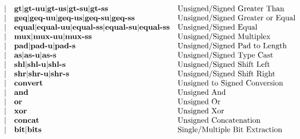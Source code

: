 \documentclass[12pt]{article}
\begin{document}
\[\begin{array}{rll}
\vert           &\text{\bf gt}         \vert \text{\bf gt-uu}      \vert \text{\bf gt-us}      \vert \text{\bf gt-su}    \vert \text{\bf gt-ss}      &\text{Unsigned/Signed Greater Than}\\
\vert           &\text{\bf geq}        \vert \text{\bf geq-uu}     \vert \text{\bf geq-us}     \vert \text{\bf geq-su}   \vert \text{\bf geq-ss}     &\text{Unsigned/Signed Greater or Equal}\\
\vert           &\text{\bf equal}      \vert \text{\bf equal-uu}   \vert \text{\bf equal-ss}   \vert \text{\bf equal-su} \vert \text{\bf equal-ss}   &\text{Unsigned/Signed Equal}\\
\vert           &\text{\bf mux}        \vert \text{\bf mux-uu}     \vert \text{\bf mux-ss}                                                 &\text{Unsigned/Signed Multiplex}\\
\vert           &\text{\bf pad}        \vert \text{\bf pad-u}      \vert \text{\bf pad-s}                                                  &\text{Unsigned/Signed Pad to Length}\\
\vert           &\text{\bf as}         \vert \text{\bf as-u}       \vert \text{\bf as-s}                                                   &\text{Unsigned/Signed Type Cast}\\
\vert           &\text{\bf shl}        \vert \text{\bf shl-u}      \vert \text{\bf shl-s}                                                  &\text{Unsigned/Signed Shift Left}\\
\vert           &\text{\bf shr}        \vert \text{\bf shr-u}      \vert \text{\bf shr-s}                                                  &\text{Unsigned/Signed Shift Right}\\
\vert           &\text{\bf convert}                                                                                              &\text{Unsigned to Signed Conversion}\\
\vert           &\text{\bf and}                                                                                                  &\text{Unsigned And}\\
\vert           &\text{\bf or}                                                                                                   &\text{Unsigned Or}\\
\vert           &\text{\bf xor}                                                                                                  &\text{Unsigned Xor}\\
\vert           &\text{\bf concat}                                                                                               &\text{Unsigned Concatenation}\\
\vert           &\text{\bf bit} \vert \text{\bf bits}                                                                                 &\text{Single/Multiple Bit Extraction}\\
\end{array}
\]
\end{document}
